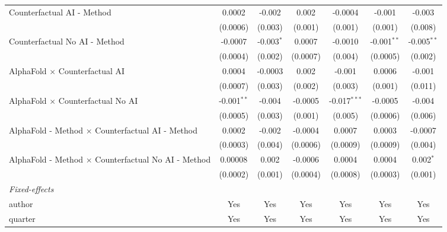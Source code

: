 \begin{tabular}{lcccccc}
   Counterfactual AI - Method                                 & 0.0002        & -0.002       & 0.002    & -0.0004        & -0.001        & -0.003\\   
                                                              & (0.0006)      & (0.003)      & (0.001)  & (0.001)        & (0.001)       & (0.008)\\   
   Counterfactual No AI - Method                              & -0.0007       & -0.003$^{*}$ & 0.0007   & -0.0010        & -0.001$^{**}$ & -0.005$^{**}$\\   
                                                              & (0.0004)      & (0.002)      & (0.0007) & (0.004)        & (0.0005)      & (0.002)\\   
   AlphaFold $\times$ Counterfactual AI                       & 0.0004        & -0.0003      & 0.002    & -0.001         & 0.0006        & -0.001\\   
                                                              & (0.0007)      & (0.003)      & (0.002)  & (0.003)        & (0.001)       & (0.011)\\   
   AlphaFold $\times$ Counterfactual No AI                    & -0.001$^{**}$ & -0.004       & -0.0005  & -0.017$^{***}$ & -0.0005       & -0.004\\   
                                                              & (0.0005)      & (0.003)      & (0.001)  & (0.005)        & (0.0006)      & (0.006)\\   
   AlphaFold - Method $\times$ Counterfactual AI - Method     & 0.0002        & -0.002       & -0.0004  & 0.0007         & 0.0003        & -0.0007\\   
                                                              & (0.0003)      & (0.004)      & (0.0006) & (0.0009)       & (0.0009)      & (0.004)\\   
   AlphaFold - Method $\times$ Counterfactual No AI - Method  & 0.00008       & 0.002        & -0.0006  & 0.0004         & 0.0004        & 0.002$^{*}$\\   
                                                              & (0.0002)      & (0.001)      & (0.0004) & (0.0008)       & (0.0003)      & (0.001)\\   
   \midrule
   \emph{Fixed-effects}\\
   author                                                     & Yes           & Yes          & Yes      & Yes            & Yes           & Yes\\  
   quarter                                                    & Yes           & Yes          & Yes      & Yes            & Yes           & Yes\\  

\end{tabular}
